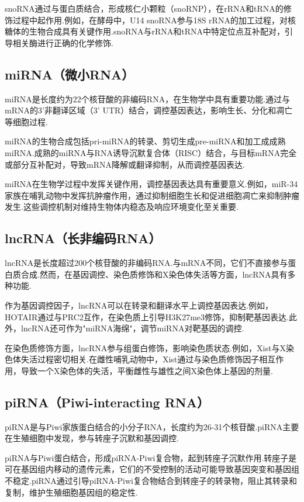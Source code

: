 snoRNA通过与蛋白质结合，形成核仁小颗粒（snoRNP），在rRNA和tRNA的修饰过程中起作用.例如，在酵母中，U14 snoRNA参与18S rRNA的加工过程，对核糖体的生物合成具有关键作用.snoRNA与rRNA和tRNA中特定位点互补配对，引导相关酶进行正确的化学修饰.

\subsection{miRNA（微小RNA）}
miRNA是长度约为22个核苷酸的非编码RNA，在生物学中具有重要功能.通过与mRNA的3'非翻译区域（3' UTR）结合，调控基因表达，影响生长、分化和凋亡等细胞过程.

miRNA的生物合成包括pri-miRNA的转录、剪切生成pre-miRNA和加工成成熟miRNA.成熟的miRNA与RNA诱导沉默复合体（RISC）结合，与目标mRNA完全或部分互补配对，导致mRNA降解或翻译抑制，从而调控基因表达.

miRNA在生物学过程中发挥关键作用，调控基因表达具有重要意义.例如，miR-34家族在哺乳动物中发挥抗肿瘤作用，通过抑制细胞生长和促进细胞凋亡来抑制肿瘤发生.这些调控机制对维持生物体内稳态及响应环境变化至关重要.

\subsection{lncRNA（长非编码RNA）}
lncRNA是长度超过200个核苷酸的非编码RNA.与mRNA不同，它们不直接参与蛋白质合成.然而，在基因调控、染色质修饰和X染色体失活等方面，lncRNA具有多种功能.

作为基因调控因子，lncRNA可以在转录和翻译水平上调控基因表达.例如，HOTAIR通过与PRC2互作，在染色质上引导H3K27me3修饰，抑制靶基因表达.此外，lncRNA还可作为"miRNA海绵"，调节miRNA对靶基因的调控.

在染色质修饰方面，lncRNA参与组蛋白修饰，影响染色质状态.例如，Xist与X染色体失活过程密切相关.在雌性哺乳动物中，Xist通过与染色质修饰因子相互作用，导致一个X染色体的失活，平衡雌性与雄性之间X染色体上基因的剂量.

\subsection{piRNA（Piwi-interacting RNA）}
piRNA是与Piwi家族蛋白结合的小分子RNA，长度约为26-31个核苷酸.piRNA主要在生殖细胞中发现，参与转座子沉默和基因调控.

piRNA与Piwi蛋白结合，形成piRNA-Piwi复合物，起到转座子沉默作用.转座子是可在基因组内移动的遗传元素，它们的不受控制的活动可能导致基因突变和基因组不稳定.piRNA通过引导piRNA-Piwi复合物结合到转座子的转录物，阻止其转录和复制，维护生殖细胞基因组的稳定性.

